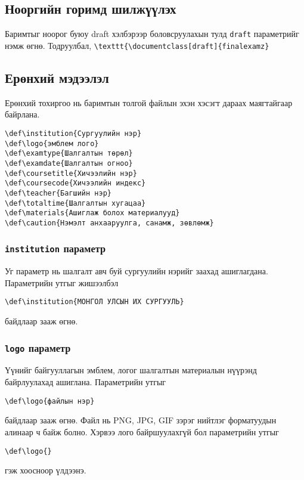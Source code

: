 \documentclass[10pt]{article}
\theoremstyle{definition}
\begin{document}
\subsection{Нооргийн горимд шилжүүлэх}

Баримтыг ноорог буюу draft хэлбэрээр боловсруулахын тулд \texttt{draft} параметрийг нэмж өгнө. Тодруулбал, \verb|\texttt{\documentclass[draft]{finalexamz}|

\subsection{Ерөнхий мэдээлэл}

Ерөнхий тохиргоо нь баримтын толгой файлын эхэн хэсэгт дараах маягтайгаар байрлана.
\begin{verbatim}
\def\institution{Сургуулийн нэр}
\def\logo{эмблем лого}
\def\examtype{Шалгалтын төрөл}
\def\examdate{Шалгалтын огноо}
\def\coursetitle{Хичээлийн нэр}
\def\coursecode{Хичээлийн индекс}
\def\teacher{Багшийн нэр}
\def\totaltime{Шалгалтын хугацаа}
\def\materials{Ашиглаж болох материалууд}
\def\caution{Нэмэлт анхааруулга, санамж, зөвлөмж}
\end{verbatim}

\subsubsection{\texttt{institution} параметр}

Уг параметр нь шалгалт авч буй сургуулийн нэрийг заахад ашиглагдана. Параметрийн утгыг жишээлбэл 
\begin{verbatim}
\def\institution{МОНГОЛ УЛСЫН ИХ СУРГУУЛЬ}
\end{verbatim}
байдлаар зааж өгнө.

\subsubsection{\texttt{logo} параметр}

Үүнийг байгууллагын эмблем, логог шалгалтын материалын нүүрэнд  байрлуулахад ашиглана. Параметрийн утгыг 
\begin{verbatim}
\def\logo{файлын нэр}
\end{verbatim}
байдлаар зааж өгнө. Файл нь PNG, JPG, GIF зэрэг нийтлэг форматуудын алинаар ч байж болно. Хэрвээ лого байршуулахгүй бол параметрийн утгыг 
\begin{verbatim}
\def\logo{}
\end{verbatim}
гэж хоосноор үлдээнэ.
\end{document}
